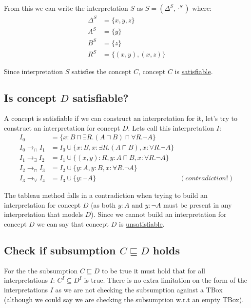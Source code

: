 \documentclass[a4paper,12pt]{article}
\begin{document}
From this we can write the interpretation $S$ as $ S = (\Delta^S, \cdot^S) $
where:
\begin{align*}
\Delta^S &= \{x,y,z\}\\
     A^S &= \{y\}\\
     B^S &= \{z\}\\
     R^S &= \{(x,y),(x,z)\}
\end{align*}

Since interpretation $S$ satisfies the concept $C$, concept $C$ is
\underline{satisfiable}.

\subsection[Concept D]{Is concept $D$ satisfiable?}
A concept is satisfiable if we can construct an interpretation for it, let's
try to construct an interpretation for concept $D$.  Lets call this
interpretation $I$:
\begin{align*}
I_0 &= \{x : B \sqcap \exists R.(A \sqcap B) \sqcap \forall R.\neg A\}\\
I_0 \to_\sqcap I_1 &= I_0 \cup \{ x : B, x : \exists R.(A \sqcap B)
                                , x : \forall R.\neg A\}\\
I_1 \to_\exists I_2 &= I_1 \cup \{ (x,y) : R, y : A \sqcap B
                                 , x : \forall R.\neg A\}\\
I_2 \to_\sqcap I_3 &= I_2 \cup \{ y : A, y : B, x : \forall R.\neg A\}\\
I_3 \to_\forall I_4 &= I_3 \cup \{ y : \neg A\} &(contradiction!)
\end{align*}

The tableau method falls in a contradiction when trying to build an
interpretation for concept $D$ (as both $ y : A $ and $ y : \neg A $ must be
present in any interpretation that models $D$).  Since we cannot build an
interpretation for concept $D$ we can say that concept $D$ is
\underline{unsatisfiable}.

\subsection[Subsumption]{Check if subsumption $C \sqsubseteq D$ holds}
For the the subsumption $ C \sqsubseteq D $ to be true it must hold that for
all interpretations $I$: $ C^I \subseteq D^I $ is true.  There is no extra
limitation on the form of the interpretations $I$ as we are not checking the
subsumption against a TBox (although we could say we are checking the
subsumption w.r.t an empty TBox).
\end{document}
